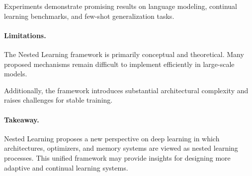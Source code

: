 \documentclass[12pt]{article}
\begin{document}
Experiments demonstrate promising results on language modeling,
continual learning benchmarks, and few-shot generalization tasks.

\paragraph{Limitations.}
The Nested Learning framework is primarily conceptual and theoretical.
Many proposed mechanisms remain difficult to implement efficiently
in large-scale models.

Additionally, the framework introduces substantial architectural
complexity and raises challenges for stable training.

\paragraph{Takeaway.}
Nested Learning proposes a new perspective on deep learning in which
architectures, optimizers, and memory systems are viewed as nested
learning processes. This unified framework may provide insights for
designing more adaptive and continual learning systems.
\end{document}
